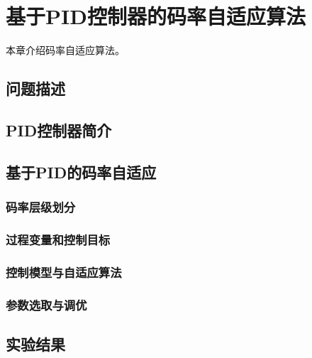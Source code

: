 \chapter{基于PID控制器的码率自适应算法}
本章介绍码率自适应算法。

\section{问题描述}

\section{PID控制器简介}

\section{基于PID的码率自适应}

\subsection{码率层级划分}

\subsection{过程变量和控制目标}

\subsection{控制模型与自适应算法}

\subsection{参数选取与调优}

\section{实验结果}